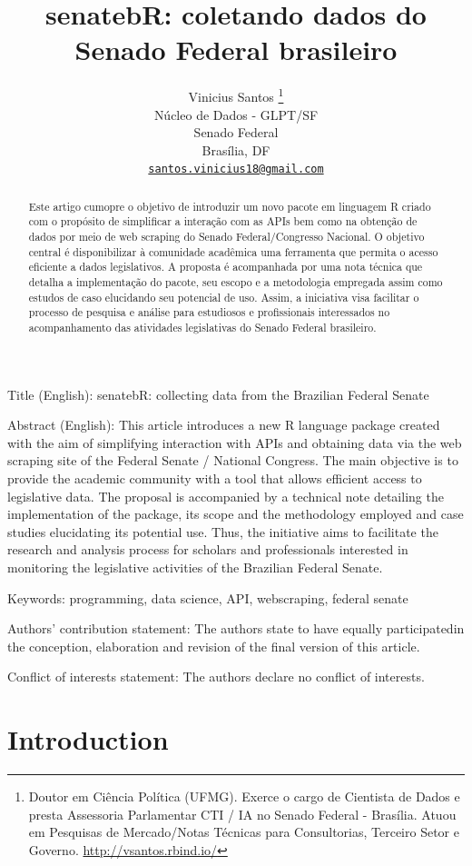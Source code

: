 \documentclass{article}
\title{senatebR: coletando dados do Senado Federal brasileiro}
\author{
    Vinicius Santos
    \thanks{Doutor em Ciência Política (UFMG). Exerce o cargo de
Cientista de Dados e presta Assessoria Parlamentar CTI / IA no Senado
Federal - Brasília. Atuou em Pesquisas de Mercado/Notas Técnicas para
Consultorias, Terceiro Setor e Governo. \url{http://vsantos.rbind.io/}}
   \\
    Núcleo de Dados - GLPT/SF \\
    Senado Federal \\
  Brasília, DF \\
  \texttt{\href{mailto:santos.vinicius18@gmail.com}{\nolinkurl{santos.vinicius18@gmail.com}}} \\
  }
\begin{document}
\maketitle


\begin{abstract}
Este artigo cumopre o objetivo de introduzir um novo pacote em linguagem
R criado com o propósito de simplificar a interação com as APIs bem como
na obtenção de dados por meio de web scraping do Senado
Federal/Congresso Nacional. O objetivo central é disponibilizar à
comunidade acadêmica uma ferramenta que permita o acesso eficiente a
dados legislativos. A proposta é acompanhada por uma nota técnica que
detalha a implementação do pacote, seu escopo e a metodologia empregada
assim como estudos de caso elucidando seu potencial de uso. Assim, a
iniciativa visa facilitar o processo de pesquisa e análise para
estudiosos e profissionais interessados no acompanhamento das atividades
legislativas do Senado Federal brasileiro.
\end{abstract}


Title (English): senatebR: collecting data from the Brazilian Federal
Senate

Abstract (English): This article introduces a new R language package
created with the aim of simplifying interaction with APIs and obtaining
data via the web scraping site of the Federal Senate / National
Congress. The main objective is to provide the academic community with a
tool that allows efficient access to legislative data. The proposal is
accompanied by a technical note detailing the implementation of the
package, its scope and the methodology employed and case studies
elucidating its potential use. Thus, the initiative aims to facilitate
the research and analysis process for scholars and professionals
interested in monitoring the legislative activities of the Brazilian
Federal Senate.

Keywords: programming, data science, API, webscraping, federal senate

Authors' contribution statement: The authors state to have equally
participatedin the conception, elaboration and revision of the final
version of this article.

Conflict of interests statement: The authors declare no conflict of
interests.

\section{Introduction}\label{introduction}
\end{document}
